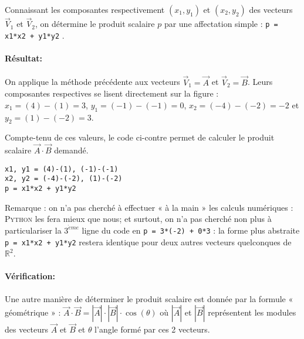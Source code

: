 \documentclass[11pt,a4paper,colorlinks,breaklinks]{article}
\def\python{\textsc{Python}}
\begin{document}
Connaissant les composantes respectivement $(x_1,y_1)$ et $(x_2,y_2)$ des 
vecteurs $\vec{V}_1$ et $\vec{V}_2$, 
on détermine le produit scalaire $p$ par une affectation simple : 
\texttt{p = x1*x2 + y1*y2} .

\paragraph{Résultat:}
On applique la méthode précédente aux vecteurs $\vec{V}_1 = \vec{A}$
et $\vec{V}_2 = \vec{B}$. Leurs composantes respectives se lisent directement 
sur la figure : 
$x_1 = (4) - (1) = 3$, $y_1 = (-1) - (-1) = 0$, 
$x_2 = (-4) - (-2) = -2$ et $y_2 = (1) - (-2) = 3$.

\noindent\begin{minipage}[t]{7cm}
Compte-tenu de ces valeurs, le code ci-contre
permet de calculer le produit scalaire $\vec{A}\cdot\vec{B}$
demandé.
\end{minipage}
\hfill
\begin{minipage}[t]{8cm}
\begin{lstlisting}[caption=\textbf{produit scalaire}]
x1, y1 = (4)-(1), (-1)-(-1)
x2, y2 = (-4)-(-2), (1)-(-2)
p = x1*x2 + y1*y2
\end{lstlisting}
\end{minipage}

Remarque : on n'a pas cherché à effectuer « à la main » les calculs numériques :
\python{} les fera mieux que nous; et surtout, on n'a pas cherché non plus à 
particulariser la $3^{\grave eme}$ ligne du code en \texttt{p = 3*(-2) + 0*3} :
la forme plus abstraite \texttt{p = x1*x2 + y1*y2} restera identique pour 
deux autres vecteurs quelconques de $\mathbb{R}^2$. 

\paragraph{Vérification:}
Une autre manière de déterminer le produit scalaire est donnée par la formule
« géométrique » : $\vec{A}\cdot\vec{B} = |\vec{A}| \cdot |\vec{B}| \cdot \cos(\theta)$ où
$|\vec{A}|$ et $|\vec{B}|$ représentent les modules des vecteurs 
$\vec{A}$ et $\vec{B}$ et $\theta$ l'angle formé par ces 2 vecteurs.
\vspace*{2mm}
\end{document}

